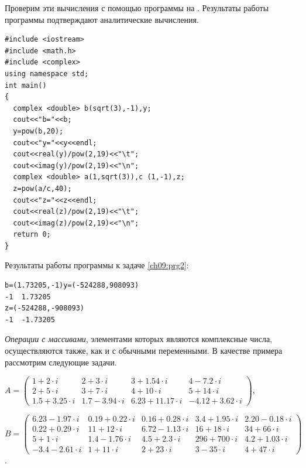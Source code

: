 Проверим эти вычисления с помощью программы на . 
Результаты работы программы подтверждают аналитические вычисления.
\begin{lstlisting}
#include <iostream>
#include <math.h>
#include <complex>
using namespace std;
int main()
{
  complex <double> b(sqrt(3),-1),y;
  cout<<"b="<<b;
  y=pow(b,20);
  cout<<"y="<<y<<endl;
  cout<<real(y)/pow(2,19)<<"\t";
  cout<<imag(y)/pow(2,19)<<"\n";
  complex <double> a(1,sqrt(3)),c (1,-1),z;
  z=pow(a/c,40);
  cout<<"z="<<z<<endl;
  cout<<real(z)/pow(2,19)<<"\t";
  cout<<imag(z)/pow(2,19)<<"\n";
  return 0;
}
\end{lstlisting}
Результаты работы программы к задаче \ref{ch09:prg2}:
\begin{verbatim}
b=(1.73205,-1)y=(-524288,908093)
-1	1.73205
z=(-524288,-908093)
-1	-1.73205
\end{verbatim}



\emph{Операции с массивами}, элементами которых являются комплексные числа, 
осуществляются также, как и с обычными
переменными. В качестве примера рассмотрим следующие задачи.

{\noindent\scriptsize
$A=\left(\begin{array}{rrrr}1+2\cdot i&2+3\cdot i&3+1.54\cdot i&4-7.2\cdot i\\2+5\cdot i&3+7\cdot i&4+10\cdot i&5+14\cdot
i\\1.5+3.25\cdot i&1.7-3.94\cdot i&6.23+11.17\cdot i&-4.12+3.62\cdot i\end{array}\right)$,

\noindent $B=\left(\begin{array}{rrrrr}6.23-1.97\cdot i&0.19+0.22\cdot i&0.16+0.28\cdot i&3.4+1.95\cdot i&2.20-0.18\cdot
i\\0.22+0.29\cdot i&11+12\cdot i&6.72-1.13\cdot i&16+18\cdot i&34+66\cdot i\\5+1\cdot i&1.4-1.76\cdot i&4.5+2.3\cdot
i&296+700\cdot i&4.2+1.03\cdot i\\-3.4-2.61\cdot i&1+11\cdot i&2+23\cdot i&3-35\cdot i&4+47\cdot i\end{array}\right)$.
}

